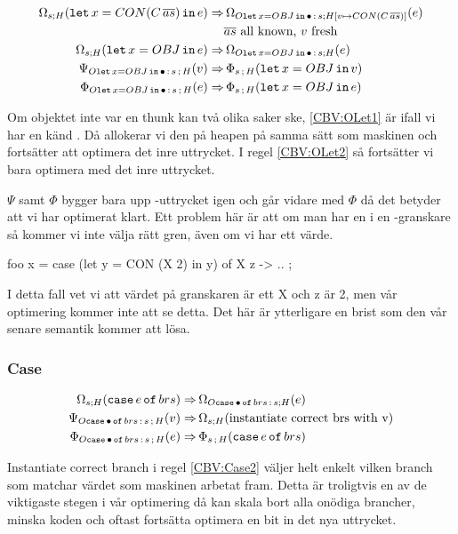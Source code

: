 \documentclass[../Optimise]{subfiles}
\begin{document}
\begin{align}
\label{CBV:OLet1} \Omega_{s;H}(\mathtt{let}\,x=CON(C\,\overline{as})\,\mathtt{in}\,e)  \Rightarrow &\, \Omega_{O\mathtt{let\,}x=OBJ\,\mathtt{in}\,\bullet\,:\,s;H[v\mapsto CON(C\,\overline{as})]}(e)\\
 & \overline{as} \text{ all known, } v \text{ fresh} \nonumber \\
\label{CBV:OLet2}\Omega_{s;H}(\mathtt{let}\,x=OBJ\,\mathtt{in}\,e)  \Rightarrow &\, \Omega_{O\mathtt{let\,}x=OBJ\,\mathtt{in}\,\bullet\,:\,s;H}(e)\\
\Psi_{O\mathtt{let\,}x=OBJ\,\mathtt{in}\,\bullet\,:\,s\,;\,H}(v)  \Rightarrow &\, \Phi_{s\,;\,H}(\mathtt{let}\,x=OBJ\,\mathtt{in}\,v)\\
\Phi_{O\mathtt{let\,}x=OBJ\,\mathtt{in}\,\bullet\,:\,s\,;\,H}(e)  \Rightarrow &\, \Phi_{s\,;\,H}(\mathtt{let}\,x=OBJ\,\mathtt{in}\,e)
\end{align}

Om objektet inte var en thunk kan två olika saker ske, \eqref{CBV:OLet1} är ifall 
vi har en känd . Då allokerar vi den på heapen på samma sätt som maskinen
och fortsätter att optimera det inre uttrycket. I regel \eqref{CBV:OLet2} så 
fortsätter vi bara optimera med det inre uttrycket.

$\Psi$ samt $\Phi$ bygger bara upp -uttrycket igen och går vidare med $\Phi$
då det betyder att vi har optimerat klart. Ett problem här är att om man har en 
i en -granskare så kommer vi inte välja rätt gren, även om vi har ett värde.

\begin{codeEx}
foo x = case (let y = CON (X 2) in y) of
    { X z -> ..
    };
\end{codeEx} 

I detta fall vet vi att värdet på granskaren är ett X och z är 2, men vår optimering
kommer inte att se detta. Det här är ytterligare en brist som den vår senare semantik
kommer att lösa.

\subsubsection{Case}
\begin{align}
\Omega_{s;H}(\mathtt{case}\,e\,\mathtt{of}\,brs) \Rightarrow &\, \Omega_{O\mathtt{case}\,\bullet\,\mathtt{of}\,brs\,:\,s;H}(e)\\
\label{CBV:Case2} \Psi_{O\mathtt{case}\,\bullet\,\mathtt{of}\,brs\,:\,s\,;\,H}(v) \Rightarrow &\, \Omega_{s;H}(\text{instantiate correct brs with v}) \\
\label{CBV:Case3} \Phi_{O\mathtt{case}\,\bullet\,\mathtt{of}\,brs\,:\,s\,;\,H}(e) \Rightarrow &\, \Phi_{s\,;\,H}(\mathtt{case}\,e\,\mathtt{of}\,brs)
\end{align}

Instantiate correct branch i regel \eqref{CBV:Case2} väljer helt enkelt vilken branch som matchar
värdet som maskinen arbetat fram. Detta är troligtvis en av de viktigaste
stegen i vår optimering då kan skala bort alla onödiga brancher, minska koden 
och oftast fortsätta optimera en bit in det nya uttrycket.
\end{document}
